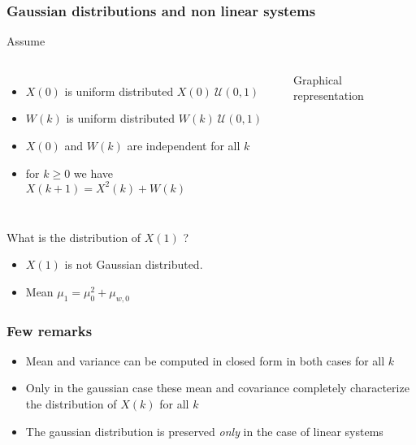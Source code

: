\begin{frame}
	\frametitle{Gaussian distributions and non linear systems}
	Assume 
	\begin{columns}
		\begin{itemize}
			\item $X(0)$ is uniform distributed $X(0)~\mathcal{U}(0, 1)$
			\item $W(k)$ is uniform distributed $W(k)~\mathcal{U}(0, 1)$
			\item $X(0)$ and $W(k)$ are independent for all $k$
			\item for $k\geq0$ we have $X(k+1) =X^2(k) + W(k)$
		\end{itemize}	
		\begin{block}{Graphical representation}
		\end{block}
	\end{columns}
	
	\vspace*{0.5em}
	
	 What is the distribution of $X(1)$ ?
	\begin{itemize}
		\item $X(1)$ is not Gaussian distributed.
		\item Mean $\mu_1=\mu_0^2+\mu_{w,0}$
	\end{itemize}
\end{frame}


\begin{frame}
	\frametitle{Few remarks}
	\begin{itemize}
		\setlength\itemsep{1.5em}
		\item Mean and variance can be computed in closed form in both cases for all $k$
		\item Only in the gaussian case these mean and covariance completely characterize the distribution of $X(k)$ for all $k$
		\item The gaussian distribution is preserved \emph{only} in the case of linear systems
	\end{itemize}  
\end{frame}